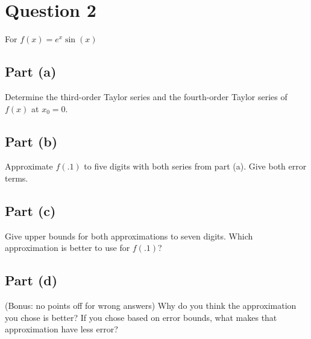 \section{Question 2}

\begin{question}
    For $f(x) = e^x \sin{(x)}$
\end{question}

\subsection{Part (a)}

\begin{question}
    Determine the third-order Taylor series and the fourth-order Taylor series of $f(x)$ at $x_0 = 0$.
\end{question}

\begin{answer}
    
\end{answer}

\subsection{Part (b)}

\begin{question}
    Approximate $f(.1)$ to five digits with both series from part (a). Give both error terms.
\end{question}

\begin{answer}
    
\end{answer}

\subsection{Part (c)}

\begin{question}
   Give upper bounds for both approximations to seven digits. Which approximation is better to use for $f(.1)$?
\end{question}

\begin{answer}
    
\end{answer}

\subsection{Part (d)}

\begin{question}
   (Bonus: no points off for wrong answers) Why do you think the approximation you chose is better? If you chose based on error bounds, what makes that approximation have less error?
\end{question}

\begin{answer}
    
\end{answer}